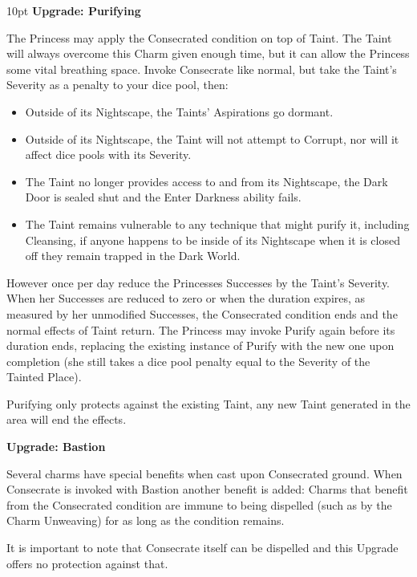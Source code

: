 \begin{myindentpar}{10pt} \textbf{Upgrade: Purifying}

The Princess may apply the Consecrated condition on top of Taint. The Taint will always overcome this Charm given enough time, but it can allow the Princess some vital breathing space. Invoke Consecrate like normal, but take the Taint’s Severity as a penalty to your dice pool, then:

   \begin{itemize} \item Outside of its Nightscape, the Taints’ Aspirations go dormant. 
    \item Outside of its Nightscape, the Taint will not attempt to Corrupt, nor will it affect dice pools with its Severity.
    \item The Taint no longer provides access to and from its Nightscape, the Dark Door is sealed shut and the Enter Darkness ability fails.
	\item The Taint remains vulnerable to any technique that might purify it, including Cleansing, if anyone happens to be inside of its Nightscape when it is closed off they remain trapped in the Dark World. \end{itemize}

However once per day reduce the Princesses Successes by the Taint’s Severity. When her Successes are reduced to zero or when the duration expires, as measured by her unmodified Successes, the Consecrated condition ends and the normal effects of Taint return. The Princess may invoke Purify again before its duration ends, replacing the existing instance of Purify with the new one upon completion (she still takes a dice pool penalty equal to the Severity of the Tainted Place).

Purifying only protects against the existing Taint, any new Taint generated in the area will end the effects.

\textbf{Upgrade: Bastion}

Several charms have special benefits when cast upon Consecrated ground. When Consecrate is invoked with Bastion another benefit is added: Charms that benefit from the Consecrated condition are immune to being dispelled (such as by the Charm Unweaving) for as long as the condition remains.

It is important to note that Consecrate itself can be dispelled and this Upgrade offers no protection against that.

\end{myindentpar}

